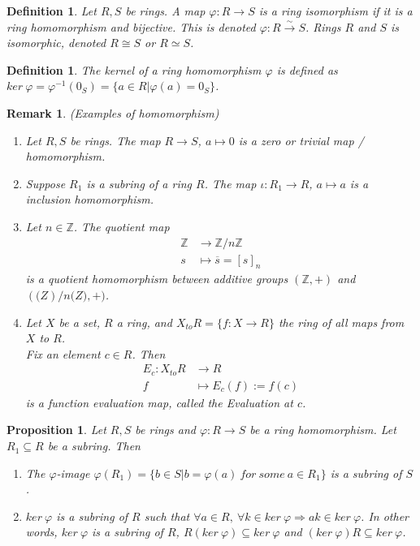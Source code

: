 \documentclass[a4paper,8pt]{article}
\newcommand{\isomorp}{\xrightarrow{\sim}}
\newcommand{\hlt}[1]{\textit{{\color{blue}#1}}}
\theoremstyle{theorem}
\newtheorem{proposition}[theorem]{Proposition}
\newtheorem{definition}[theorem]{Definition}
\newtheorem{remark}[theorem]{Remark}
\begin{document}
\begin{definition}
Let $R, S$ be rings. A map $\varphi: R \rightarrow S$ is a \hlt{ring isomorphism} if it is a ring homomorphism and bijective.
This is denoted $\varphi: R \isomorp S$. Rings $R$ and $S$ is \hlt{isomorphic}, denoted $R \cong S$ or $R \simeq S$.
\end{definition}


\begin{definition}
The \hlt{kernel} of a ring homomorphism $\varphi$ is defined as $ker \ \varphi = \varphi^{-1}(0_S) = \{a \in R | \varphi(a) = 0_S\} $.
\end{definition}


\begin{remark}
\hlt{(Examples of homomorphism)}
\begin{enumerate}[label=(\roman*)]
\item Let $R, S$ be rings. The map $R \rightarrow S$, $a \mapsto 0$ is a \hlt{zero or trivial map / homomorphism}.
\item Suppose $R_1$ is a subring of a ring $R$. The map $\iota: R_1 \rightarrow R$, $a \mapsto a$ is a \hlt{inclusion homomorphism}.
\item Let $n \in \mathbb{Z}$. The quotient map 
\begin{align}
\mathbb{Z} &\rightarrow \mathbb{Z}/n\mathbb{Z} \nonumber \\
s &\mapsto \overline{s} = [s]_n \nonumber
\end{align} 
is a \hlt{quotient homomorphism} between additive groups $(\mathbb{Z}, +)$ and $(\mathbb(Z)/n\mathbb(Z), +)$.
\item Let $X$ be a set, $R$ a ring, and $X_{to}R = \{f: X \rightarrow R\}$ the ring of all maps from $X$ to $R$.\\
Fix an element $c\in R$. Then 
\begin{align}
E_c: X_{to}R &\rightarrow R \nonumber \\
f &\mapsto E_c(f) := f(c) \nonumber
\end{align}
is a \hlt{function evaluation map}, called the \hlt{Evaluation at $c$}.
\end{enumerate}
\end{remark}


\begin{proposition}
Let $R, S$ be rings and $\varphi: R \rightarrow S$ be a ring homomorphism. Let $R_1 \subseteq R$ be a subring. Then
\begin{enumerate}[label=(\roman*)]
\item The $\varphi$-image $\varphi(R_1) = \{b \in S | b = \varphi(a) \ for \ some \ a \in R_1\}$ is a subring of $S$.
\item $ker \ \varphi$ is a subring of $R$ such that $\forall a \in R, \ \forall k \in ker \ \varphi \Rightarrow ak \in ker \ \varphi$. In other words, $ker \ \varphi$ is a subring of $R$, $R(ker \ \varphi) \subseteq ker \ \varphi$ and $(ker \ \varphi)R \subseteq ker \ \varphi$.
\end{enumerate}
\end{proposition}
\end{document}
